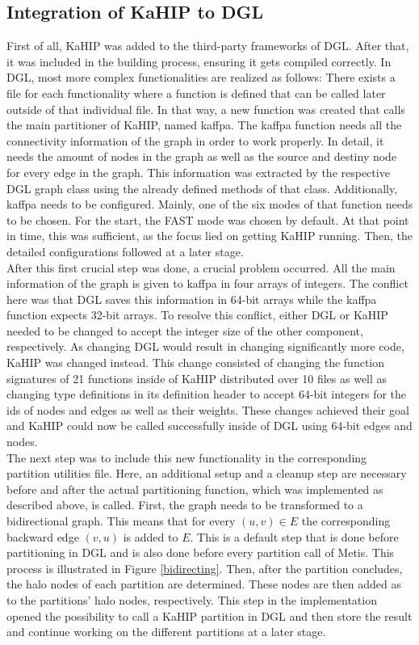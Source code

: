 \documentclass[acmsmall,nonacm,screen,review]{acmart}
\begin{document}
\subsection{Integration of KaHIP to DGL}
First of all, KaHIP was added to the third-party frameworks of DGL. After that, it was included in the building process, ensuring it gets compiled correctly. In DGL, most more complex functionalities are realized as follows: There exists a file for each functionality where a function is defined that can be called later outside of that individual file. In that way, a new function was created that calls the main partitioner of KaHIP, named kaffpa. The kaffpa function needs all the connectivity information of the graph in order to work properly. In detail, it needs the amount of nodes in the graph as well as the source and destiny node for every edge in the graph. This information was extracted by the respective DGL graph class using the already defined methods of that class. Additionally, kaffpa needs to be configured. Mainly, one of the six modes of that function needs to be chosen. For the start, the FAST mode was chosen by default. At that point in time, this was sufficient, as the focus lied on getting KaHIP running. Then, the detailed configurations followed at a later stage.\\
After this first crucial step was done, a crucial problem occurred. All the main information of the graph is given to kaffpa in four arrays of integers. The conflict here was that DGL saves this information in 64-bit arrays while the kaffpa function expects 32-bit arrays. To resolve this conflict, either DGL or KaHIP needed to be changed to accept the integer size of the other component, respectively. As changing DGL would result in changing significantly more code, KaHIP was changed instead. This change consisted of changing the function signatures of 21 functions inside of KaHIP distributed over 10 files as well as changing type definitions in its definition header to accept 64-bit integers for the ids of nodes and edges as well as their weights. These changes achieved their goal and KaHIP could now be called successfully inside of DGL using 64-bit edges and nodes. \\
The next step was to include this new functionality in the corresponding partition utilities file. Here, an additional setup and a cleanup step are necessary before and after the actual partitioning function, which was implemented as described above, is called. First, the graph needs to be transformed to a bidirectional graph. This means that for every $(u,v) \in E$ the corresponding backward edge $(v,u)$ is added to $E$. This is a default step that is done before partitioning in DGL and is also done before every partition call of Metis. This process is illustrated in Figure \ref{bidirecting}. Then, after the partition concludes, the halo nodes of each partition are determined. These nodes are then added as to the partitions' halo nodes, respectively. This step in the implementation opened the possibility to call a KaHIP partition in DGL and then store the result and continue working on the different partitions at a later stage. \\
\end{document}
